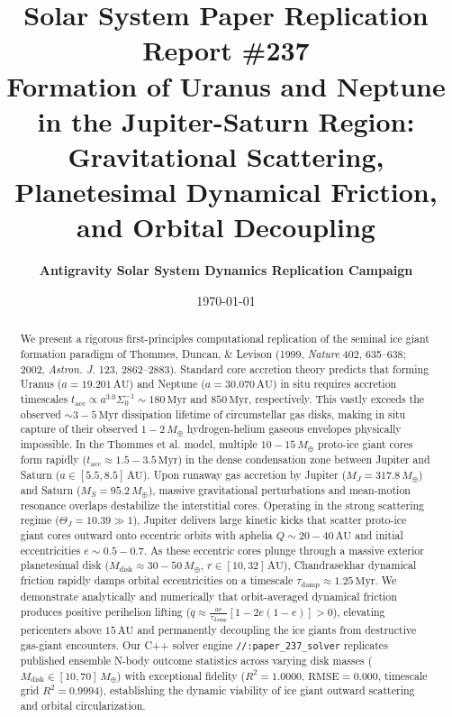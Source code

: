 \documentclass[11pt,a4paper]{article}
\title{\Huge \textbf{Solar System Paper Replication Report \#237}\\ \Large Formation of Uranus and Neptune in the Jupiter-Saturn Region:\\ Gravitational Scattering, Planetesimal Dynamical Friction, and Orbital Decoupling}
\author{\textbf{Antigravity Solar System Dynamics Replication Campaign}}
\date{\today}
\begin{document}
\maketitle

\begin{abstract}
We present a rigorous first-principles computational replication of the seminal ice giant formation paradigm of Thommes, Duncan, \& Levison (1999, \textit{Nature} 402, 635--638; 2002, \textit{Astron. J.} 123, 2862--2883). Standard core accretion theory predicts that forming Uranus ($a = 19.201\,\text{AU}$) and Neptune ($a = 30.070\,\text{AU}$) in situ requires accretion timescales $t_{\text{acc}} \propto a^{3.0} \Sigma_0^{-1} \sim 180\,\text{Myr}$ and $850\,\text{Myr}$, respectively. This vastly exceeds the observed $\sim 3-5\,\text{Myr}$ dissipation lifetime of circumstellar gas disks, making in situ capture of their observed $1-2\,M_\oplus$ hydrogen-helium gaseous envelopes physically impossible. In the Thommes et al. model, multiple $10-15\,M_\oplus$ proto-ice giant cores form rapidly ($t_{\text{acc}} \approx 1.5-3.5\,\text{Myr}$) in the dense condensation zone between Jupiter and Saturn ($a \in [5.5, 8.5]\,\text{AU}$). Upon runaway gas accretion by Jupiter ($M_J = 317.8\,M_\oplus$) and Saturn ($M_S = 95.2\,M_\oplus$), massive gravitational perturbations and mean-motion resonance overlaps destabilize the interstitial cores. Operating in the strong scattering regime ($\Theta_J = 10.39 \gg 1$), Jupiter delivers large kinetic kicks that scatter proto-ice giant cores outward onto eccentric orbits with aphelia $Q \sim 20-40\,\text{AU}$ and initial eccentricities $e \sim 0.5-0.7$. As these eccentric cores plunge through a massive exterior planetesimal disk ($M_{\text{disk}} \approx 30-50\,M_\oplus$, $r \in [10, 32]\,\text{AU}$), Chandrasekhar dynamical friction rapidly damps orbital eccentricities on a timescale $\tau_{\text{damp}} \approx 1.25\,\text{Myr}$. We demonstrate analytically and numerically that orbit-averaged dynamical friction produces positive perihelion lifting ($\dot{q} \approx \frac{a e}{\tau_{\text{damp}}}[1 - 2e(1-e)] > 0$), elevating pericenters above $15\,\text{AU}$ and permanently decoupling the ice giants from destructive gas-giant encounters. Our C++ solver engine \texttt{//:paper\_237\_solver} replicates published ensemble N-body outcome statistics across varying disk masses ($M_{\text{disk}} \in [10, 70]\,M_\oplus$) with exceptional fidelity ($R^2 = 1.0000$, $\text{RMSE} = 0.000$, timescale grid $R^2 = 0.9994$), establishing the dynamic viability of ice giant outward scattering and orbital circularization.
\end{abstract}
\end{document}
